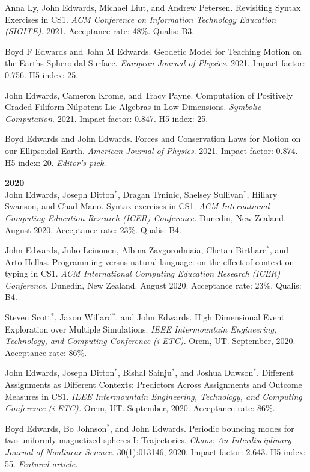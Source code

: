 \documentclass[margin,line]{res}
\newcommand{\pubunder}[1]{#1}
\begin{document}
\begin{resume}
Anna Ly, John Edwards, Michael Liut, and Andrew Petersen. Revisiting Syntax Exercises in CS1. \textit{ACM Conference on Information Technology Education (SIGITE).} 2021. Acceptance rate: 48\%. Qualis: B3.

Boyd F Edwards and John M Edwards. Geodetic Model for Teaching Motion on the Earths Spheroidal Surface. \textit{European Journal of Physics}. 2021. Impact factor: 0.756. H5-index: 25.

John Edwards, Cameron Krome, and Tracy Payne. Computation of Positively Graded Filiform Nilpotent Lie Algebras in Low Dimensions. \textit{Symbolic Computation}. 2021. Impact factor: 0.847. H5-index: 25.

Boyd Edwards and John Edwards. Forces and Conservation Laws for Motion on our Ellipsoidal Earth. \textit{American Journal of Physics}. 2021. Impact factor: 0.874. H5-index: 20. \textit{Editor's pick.}


\textbf{2020} \\
John Edwards, Joseph Ditton$^*$, Dragan Trninic, Shelsey Sullivan$^*$, Hillary Swanson, and Chad Mano. Syntax exercises in CS1. \textit{ACM International Computing Education Research (ICER) Conference.} Dunedin, New Zealand. August 2020. Acceptance rate: 23\%. Qualis: B4.

John Edwards, Juho Leinonen, Albina Zavgorodniaia, Chetan Birthare$^*$, and Arto Hellas. Programming versus natural language: on the effect of context on typing in CS1. \textit{ACM International Computing Education Research (ICER) Conference.} Dunedin, New Zealand. August 2020. Acceptance rate: 23\%. Qualis: B4.

Steven Scott$^*$, Jaxon Willard$^*$, and \pubunder{John Edwards}. High Dimensional Event Exploration over Multiple Simulations. \textit{IEEE Intermountain Engineering, Technology, and Computing Conference (i-ETC).} Orem, UT. September, 2020. Acceptance rate: 86\%.

John Edwards, Joseph Ditton$^*$, Bishal Sainju$^*$, and Joshua Dawson$^*$. Different Assignments as Different Contexts: Predictors Across Assignments and Outcome Measures in CS1. \textit{IEEE Intermountain Engineering, Technology, and Computing Conference (i-ETC).} Orem, UT. September, 2020. Acceptance rate: 86\%.

Boyd Edwards, Bo Johnson$^*$, and \pubunder{John Edwards}. Periodic bouncing modes for two uniformly magnetized spheres I: Trajectories. \textit{Chaos: An Interdisciplinary Journal of Nonlinear Science}. 30(1):013146, 2020. Impact factor: 2.643. H5-index: 55. \textit{Featured article.}


\end{resume}
\end{document}
